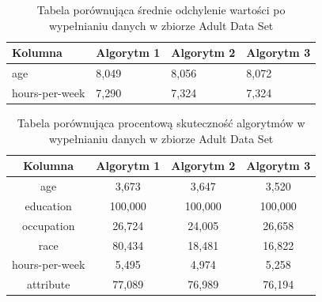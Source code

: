 \documentclass[12pt,twoside]{article}
\begin{document}
\begin{table}[ht]
    \caption{Tabela porównująca średnie odchylenie wartości po wypełnianiu danych w zbiorze Adult Data Set}
    \centering
    \begin{tabular}{|l|l|l|l|}
        \hline
        \textbf{Kolumna} & \textbf{Algorytm 1} & \textbf{Algorytm 2} & \textbf{Algorytm 3} \\ \hline
        age              & 8,049               & 8,056               & 8,072               \\ \hline
        hours-per-week   & 7,290               & 7,324               & 7,324               \\ \hline
    \end{tabular}
    \label{tab:adult_aad}
\end{table}
\FloatBarrier

\begin{table}[ht]
    \caption{Tabela porównująca procentową skuteczność algorytmów w wypełnianiu danych w zbiorze Adult Data Set}
    \centering
    \begin{tabular}{|c|c|c|c|}
        \hline
        \textbf{Kolumna} & \textbf{Algorytm 1} & \textbf{Algorytm 2} & \textbf{Algorytm 3} \\ \hline
        age              & 3,673               & 3,647               & 3,520               \\ \hline
        education        & 100,000             & 100,000             & 100,000             \\ \hline
        occupation       & 26,724              & 24,005              & 26,658              \\ \hline
        race             & 80,434              & 18,481              & 16,822              \\ \hline
        hours-per-week   & 5,495               & 4,974               & 5,258               \\ \hline
        attribute        & 77,089              & 76,989              & 76,194              \\ \hline
    \end{tabular}
    \label{tab:adult_acc}
\end{table}
\FloatBarrier
\end{document}

